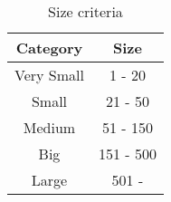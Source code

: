 \begin{table}[]
\centering
\caption{Size criteria}
\begin{tabular}{c|c}
\hline
\textbf{Category}   & \textbf{Size}      \\ \hline
Very Small & 1 - 20    \\ \hline
Small      & 21 - 50   \\ \hline
Medium     & 51 - 150  \\ \hline
Big        & 151 - 500 \\ \hline
Large      & 501 -       \\ \hline
\end{tabular}
\label{table: size criteria}
\end{table}